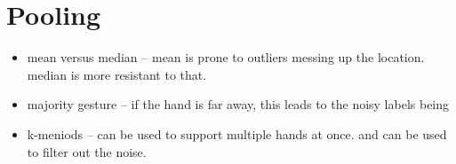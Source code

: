 \section{Pooling}
\begin{itemize}
\item mean versus median -- mean is prone to outliers messing up the location. median is more resistant to that.
\item majority gesture -- if the hand is far away, this leads to the noisy labels being 
\item k-meniods -- can be used to support multiple hands at once. and can be used to filter out the noise.
\end{itemize}
